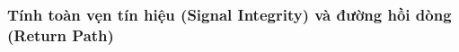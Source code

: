                 \subsubsection{Tính toàn vẹn tín hiệu (Signal Integrity) và đường hồi dòng (Return Path)}
                        
                        

